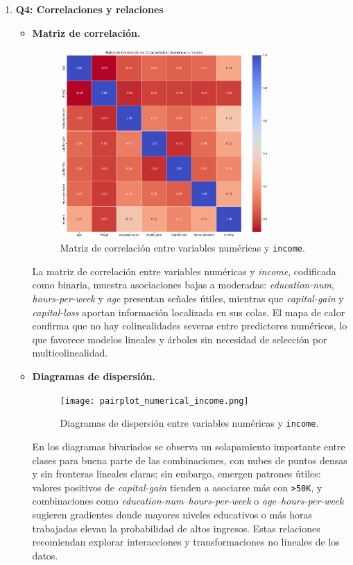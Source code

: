 \documentclass[12pt,a4paper]{article}
\begin{document}
\begin{enumerate}
    \item \textbf{Q4: Correlaciones y relaciones}
    \begin{itemize}
      \item \textbf{Matriz de correlación.}
      \begin{figure}[H]
        \centering
        \includegraphics[width=0.8\textwidth]{correlation_matrix_numerical_income.png}
        \caption{Matriz de correlación entre variables numéricas y \texttt{income}.}
        \label{fig:correlation_matrix}
      \end{figure}

      La matriz de correlación entre variables numéricas y \emph{income}, codificada como binaria, muestra asociaciones bajas 
      a moderadas: \emph{education-num}, \emph{hours-per-week} y \emph{age} presentan señales útiles, mientras que \emph{capital-gain} 
      y \emph{capital-loss} aportan información localizada en sus colas. El mapa de calor confirma que no hay colinealidades severas entre 
      predictores numéricos, lo que favorece modelos lineales y árboles sin necesidad de selección por multicolinealidad.
      \vfil

      \item \textbf{Diagramas de dispersión.}
      \begin{figure}[H]
        \centering
        \texttt{[image: pairplot\_numerical\_income.png]}
        \caption{Diagramas de dispersión entre variables numéricas y \texttt{income}.}
        \label{fig:scatter_matrix_income}
      \end{figure}

      En los diagramas bivariados se observa un solapamiento importante entre clases para buena parte de las combinaciones, con nubes de 
      puntos densas y sin fronteras lineales claras; sin embargo, emergen patrones útiles: valores positivos de \emph{capital-gain} tienden a 
      asociarse más con \texttt{>50K}, y combinaciones como \emph{education-num}–\emph{hours-per-week} o \emph{age}–\emph{hours-per-week} 
      sugieren gradientes donde mayores niveles educativos o más horas trabajadas elevan la probabilidad de altos ingresos. Estas relaciones 
      recomiendan explorar interacciones y transformaciones no lineales de los datos.


\end{itemize}
\end{enumerate}
\end{document}
